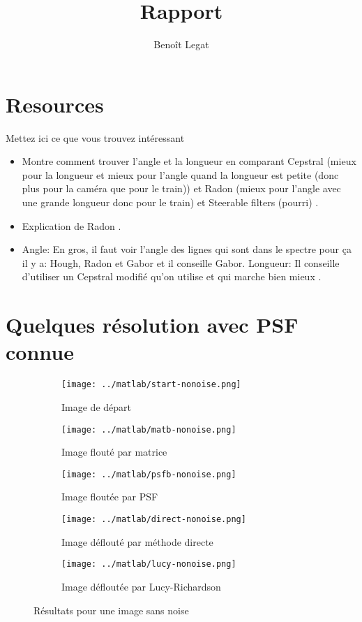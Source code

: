 \documentclass{article}
\title{Rapport}
\author{Benoît Legat}
\begin{document}
\maketitle

\section{Resources}
Mettez ici ce que vous trouvez intéressant
\begin{itemize}
  \item Montre comment trouver l'angle et la longueur en comparant Cepstral (mieux pour la longueur et mieux pour l'angle quand la longueur est petite (donc plus pour la caméra que pour le train)) et Radon (mieux pour l'angle avec une grande longueur donc pour le train) et Steerable filters (pourri) \cite{krahmer2006blind}.
  \item Explication de Radon \cite{oliveira2007blind}.
  \item Angle: En gros, il faut voir l'angle des lignes qui sont dans le spectre pour ça il y a: Hough, Radon et Gabor et il conseille Gabor.
    Longueur: Il conseille d'utiliser un Cepstral modifié qu'on utilise et qui marche bien mieux \cite{Deshpande2014606}.
\end{itemize}

\section{Quelques résolution avec PSF connue}

\begin{figure}[!ht]
  \centering
  \begin{subfigure}[b]{0.45\textwidth}
    \texttt{[image: ../matlab/start-nonoise.png]}
    \caption{Image de départ}
    \label{fig:start-nonoise}
  \end{subfigure}
  \begin{subfigure}[b]{0.45\textwidth}
    \texttt{[image: ../matlab/matb-nonoise.png]}
    \caption{Image flouté par matrice}
    \label{fig:matb-nonoise}
  \end{subfigure}%
  \begin{subfigure}[b]{0.45\textwidth}
    \texttt{[image: ../matlab/psfb-nonoise.png]}
    \caption{Image floutée par PSF}
    \label{fig:psfb-nonoise_explicite_lambda}
  \end{subfigure}
  \begin{subfigure}[b]{0.45\textwidth}
    \texttt{[image: ../matlab/direct-nonoise.png]}
    \caption{Image déflouté par méthode directe}
    \label{fig:direct-nonoise}
  \end{subfigure}
  \begin{subfigure}[b]{0.45\textwidth}
    \texttt{[image: ../matlab/lucy-nonoise.png]}
    \caption{Image défloutée par Lucy-Richardson}
    \label{fig:lucy-nonoise}
  \end{subfigure}
  \caption{Résultats pour une image sans noise}
  \label{fig:nonoise}
\end{figure}
\end{document}
